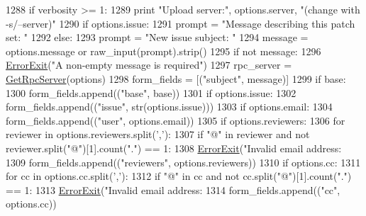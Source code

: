 \begin{DoxyCode}
{{1288   \textcolor{keywordflow}{if} verbosity >= 1:
1289     \textcolor{keywordflow}{print} \textcolor{stringliteral}{"Upload server:"}, options.server, \textcolor{stringliteral}{"(change with -s/--server)"}
1290   \textcolor{keywordflow}{if} options.issue:
1291     prompt = \textcolor{stringliteral}{"Message describing this patch set: "}
1292   \textcolor{keywordflow}{else}:
1293     prompt = \textcolor{stringliteral}{"New issue subject: "}
1294   message = options.message \textcolor{keywordflow}{or} raw\_input(prompt).strip()
1295   \textcolor{keywordflow}{if} \textcolor{keywordflow}{not} message:
1296     \hyperlink{namespaceupload_adea53186a1d73e92cc839b7c35c2c044}{ErrorExit}(\textcolor{stringliteral}{"A non-empty message is required"})
1297   rpc\_server = \hyperlink{namespaceupload_a1dadef480a702dbc5d0fb66203b9abe7}{GetRpcServer}(options)
1298   form\_fields = [(\textcolor{stringliteral}{"subject"}, message)]
1299   \textcolor{keywordflow}{if} base:
1300     form\_fields.append((\textcolor{stringliteral}{"base"}, base))
1301   \textcolor{keywordflow}{if} options.issue:
1302     form\_fields.append((\textcolor{stringliteral}{"issue"}, str(options.issue)))
1303   \textcolor{keywordflow}{if} options.email:
1304     form\_fields.append((\textcolor{stringliteral}{"user"}, options.email))
1305   \textcolor{keywordflow}{if} options.reviewers:
1306     \textcolor{keywordflow}{for} reviewer \textcolor{keywordflow}{in} options.reviewers.split(\textcolor{stringliteral}{','}):
1307       \textcolor{keywordflow}{if} \textcolor{stringliteral}{"@"} \textcolor{keywordflow}{in} reviewer \textcolor{keywordflow}{and} \textcolor{keywordflow}{not} reviewer.split(\textcolor{stringliteral}{"@"})[1].count(\textcolor{stringliteral}{"."}) == 1:
1308         \hyperlink{namespaceupload_adea53186a1d73e92cc839b7c35c2c044}{ErrorExit}(\textcolor{stringliteral}{"Invalid email address: %
1309     form\_fields.append((\textcolor{stringliteral}{"reviewers"}, options.reviewers))
1310   \textcolor{keywordflow}{if} options.cc:
1311     \textcolor{keywordflow}{for} cc \textcolor{keywordflow}{in} options.cc.split(\textcolor{stringliteral}{','}):
1312       \textcolor{keywordflow}{if} \textcolor{stringliteral}{"@"} \textcolor{keywordflow}{in} cc \textcolor{keywordflow}{and} \textcolor{keywordflow}{not} cc.split(\textcolor{stringliteral}{"@"})[1].count(\textcolor{stringliteral}{"."}) == 1:
1313         \hyperlink{namespaceupload_adea53186a1d73e92cc839b7c35c2c044}{ErrorExit}(\textcolor{stringliteral}{"Invalid email address: %
1314     form\_fields.append((\textcolor{stringliteral}{"cc"}, options.cc))
}}}}
\end{DoxyCode}
